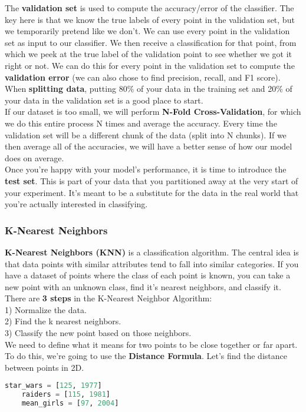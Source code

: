 \documentclass[11pt, a4paper]{article}
\begin{document}
\begin{spacing}{1.1}
	The \textbf{validation set} is used to compute the accuracy/error of the classifier. The key here is that we know the true labels of every point in the validation set, but we temporarily pretend like we don’t. We can use every point in the validation set as input to our classifier. We then receive a classification for that point, from which we peek at the true label of the validation point to see whether we got it right or not. We can do this for every point in the validation set to compute the \textbf{validation error} (we can also chose to find precision, recall, and F1 score). \vspace*{1.5mm} \\
	When \textbf{splitting data}, putting 80\% of your data in the training set and 20\% of your data in the validation set is a good place to start. \vspace*{1.5mm} \\
	If our dataset is too small, we will perform \textbf{N-Fold Cross-Validation}, for which we do this entire process N times and average the accuracy. Every time the validation set will be a different chunk of the data (split into N chunks). If we then average all of the accuracies, we will have a better sense of how our model does on average. \vspace*{1.5mm} \\
	Once you’re happy with your model’s performance, it is time to introduce the \textbf{test set}. This is part of your data that you partitioned away at the very start of your experiment. It’s meant to be a substitute for the data in the real world that you’re actually interested in classifying. \newpage
	\subsubsection{K-Nearest Neighbors}
	\textbf{K-Nearest Neighbors (KNN)} is a classification algorithm. The central idea is that data points with similar attributes tend to fall into similar categories. If you have a dataset of points where the class of each point is known, you can take a new point with an unknown class, find it’s nearest neighbors, and classify it. \vspace*{2mm} \\
	There are \textbf{3 steps} in the K-Nearest Neighbor Algorithm: \\
	\hspace*{3mm} 1) Normalize the data. \\
	\hspace*{3mm} 2) Find the k nearest neighbors. \\
	\hspace*{3mm} 3) Classify the new point based on those neighbors. \vspace*{2mm} \\
	We need to define what it means for two points to be close together or far apart. To do this, we’re going to use the \textbf{Distance Formula}. Let's find the distance between points in 2D.
	\begin{lstlisting}[language=Python]
	star_wars = [125, 1977]
	raiders = [115, 1981]
	mean_girls = [97, 2004]
	

\end{lstlisting}
\end{spacing}
\end{document}
